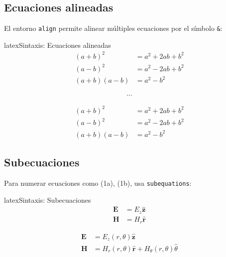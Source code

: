 \subsection{Ecuaciones alineadas}
\label{subsec:ecuaciones-alineadas}

El entorno \texttt{align} permite alinear múltiples ecuaciones por el símbolo \texttt{\&}:

\begin{codigosimple}{latex}{Sintaxis: Ecuaciones alineadas}
\begin{align}
  (a+b)^2 &= a^2 + 2ab + b^2 \label{eq:binomio-suma} \\
  (a-b)^2 &= a^2 - 2ab + b^2 \label{eq:binomio-resta} \\
  (a+b)(a-b) &= a^2 - b^2    \label{eq:diferencia-cuadrados}
\end{align}

\begin{align*}
  ...
\end{align*}
\end{codigosimple}

\begin{align}
  (a+b)^2 &= a^2 + 2ab + b^2    \label{eq:binomio-suma-demo} \\
  (a-b)^2 &= a^2 - 2ab + b^2    \label{eq:binomio-resta-demo} \\
  (a+b)(a-b) &= a^2 - b^2       \label{eq:diferencia-cuadrados-demo}
\end{align}

\subsection{Subecuaciones}
\label{subsec:subecuaciones}

Para numerar ecuaciones como (1a), (1b), usa \texttt{subequations}:

\begin{codigosimple}{latex}{Sintaxis: Subecuaciones}
\begin{subequations}
  \begin{align}
    \mathbf{E} &= E_z \hat{\mathbf{z}} \label{eq:campo-E} \\
    \mathbf{H} &= H_r \hat{\mathbf{r}} \label{eq:campo-H}
  \end{align}
\end{subequations}
\end{codigosimple}

\begin{subequations}
  \label{eq:campos-EM}
  \begin{align}
    \mathbf{E} &= E_z(r,\theta) \hat{\mathbf{z}} \label{eq:E} \\
    \mathbf{H} &= H_r(r,\theta) \hat{\mathbf{r}} + H_\theta(r,\theta) \hat{\theta} \label{eq:H}
  \end{align}
\end{subequations}

